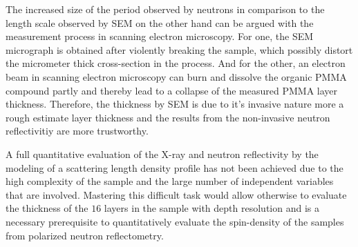 \documentclass[\main/dresen_thesis.tex]{subfiles}
\begin{document}
  The increased size of the period observed by neutrons in comparison to the length scale observed by SEM on the other hand can be argued with the measurement process in scanning electron microscopy.
  For one, the SEM micrograph is obtained after violently breaking the sample, which possibly distort the micrometer thick cross-section in the process.
  And for the other, an electron beam in scanning electron microscopy can burn and dissolve the organic PMMA compound partly and thereby lead to a collapse of the measured PMMA layer thickness.
  Therefore, the thickness by SEM is due to it's invasive nature more a rough estimate layer thickness and the results from the non-invasive neutron reflectivitiy are more trustworthy.

  A full quantitative evaluation of the X-ray and neutron reflectivity by the modeling of a scattering length density profile has not been achieved due to the high complexity of the sample and the large number of independent variables that are involved.
  Mastering this difficult task would allow otherwise to evaluate the thickness of the $16$ layers in the sample with depth resolution and is a necessary prerequisite to quantitatively evaluate the spin-density of the samples from polarized neutron reflectometry.
\end{document}
